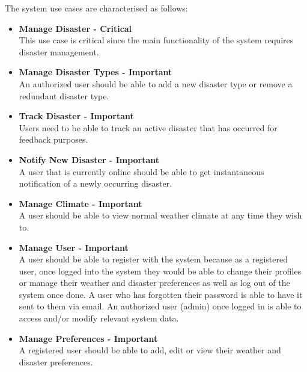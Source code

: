 The system use cases are characterised as follows:
 \begin{itemize}

 	\item \textbf{Manage Disaster - Critical}\\ This use case is critical since the main functionality of the system requires disaster management.
 	\item \textbf{Manage Disaster Types - Important}\\ An authorized user should be able to add a new disaster type or remove a redundant disaster type.
	\item \textbf{Track Disaster - Important}\\ Users need to be able to track an active disaster that has occurred for feedback purposes. 
 	\item \textbf{Notify New Disaster - Important}\\ A user that is currently online should be able to get instantaneous notification of a newly occurring disaster.
 	\item \textbf{Manage Climate - Important}\\ A user should be able to view normal weather climate at any time they wish to.
 	\item \textbf{Manage User - Important} \\ A user should be able to register with the system because as a registered user, once logged into the system they would be able to change their profiles or manage their weather and disaster preferences as well as log out of the system once done. A user who has forgotten their password is able to have it sent to them via email. An authorized user (admin) once logged in is able to access and/or modify relevant system data.
	\item \textbf{Manage Preferences - Important} \\ A registered user should be able to add, edit or view their weather and disaster preferences.  
 \end{itemize}